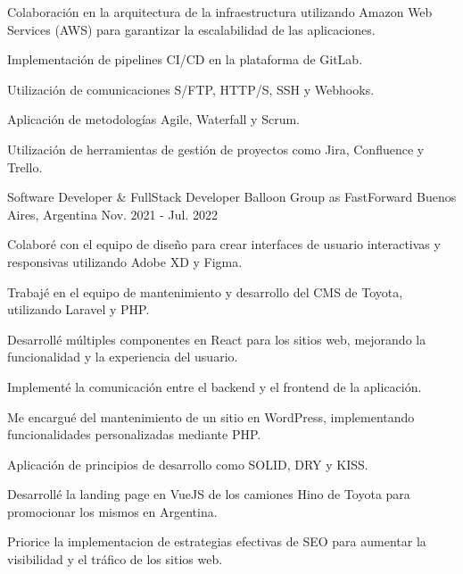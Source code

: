 \begin{cventries}
{\begin{cvitems}
        \item {Colaboración en la arquitectura de la infraestructura utilizando Amazon Web Services (AWS) para garantizar la escalabilidad de las aplicaciones.}
        \item {Implementación de pipelines CI/CD en la plataforma de GitLab.}
        \item {Utilización de comunicaciones S/FTP, HTTP/S, SSH y Webhooks.}
        \item {Aplicación de metodologías Agile, Waterfall y Scrum.}
        \item {Utilización de herramientas de gestión de proyectos como Jira, Confluence y Trello.}
      \end{cvitems}
    }
  \vspace{5.5mm}
  \cventry
    {Software Developer \& FullStack Developer} %
    {Balloon Group as FastForward} %
    {Buenos Aires, Argentina} %
    {Nov. 2021 - Jul. 2022} %
    {
      \begin{cvitems} %
        \item {Colaboré con el equipo de diseño para crear interfaces de usuario interactivas y responsivas utilizando Adobe XD y Figma.}
        \item {Trabajé en el equipo de mantenimiento y desarrollo del CMS de Toyota, utilizando Laravel y PHP.}
        \item {Desarrollé múltiples componentes en React para los sitios web, mejorando la funcionalidad y la experiencia del usuario.}
        \item {Implementé la comunicación entre el backend y el frontend de la aplicación.}
        \item {Me encargué del mantenimiento de un sitio en WordPress, implementando funcionalidades personalizadas mediante PHP.}
        \item {Aplicación de principios de desarrollo como SOLID, DRY y KISS.}
        \item {Desarrollé la landing page en VueJS de los camiones Hino de Toyota para promocionar los mismos en Argentina.}
        \item { Priorice la implementacion de estrategias efectivas de SEO para aumentar la visibilidad y el tráfico de los sitios web.}
      \end{cvitems}
    }
  \vspace{5.5mm}

\end{cventries}
